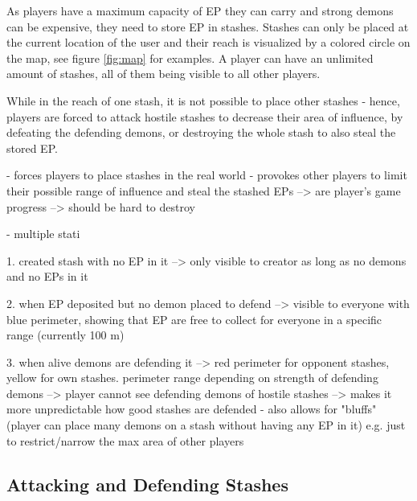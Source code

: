 As players have a maximum capacity of EP they can carry and strong demons can be expensive, they need to store EP in stashes.
Stashes can only be placed at the current location of the user and their reach is visualized by a colored circle on the map, see figure \ref{fig:map} for examples.
A player can have an unlimited amount of stashes, all of them being visible to all other players. 

While in the reach of one stash, it is not possible to place other stashes - hence, players are forced to attack hostile stashes to decrease their area of influence, by defeating the defending demons, or destroying the whole stash to also steal the stored EP.

- forces players to place stashes in the real world 
- provokes other players to limit their possible range of influence and steal the stashed EPs
--> are player's game progress
--> should be hard to destroy

- multiple stati

1. created stash with no EP in it --> only visible to creator as long as no demons and no EPs in it

2. when EP deposited but no demon placed to defend --> visible to everyone with blue perimeter, showing that EP are free to collect for everyone in a specific range (currently 100 m)

3. when alive demons are defending it --> red perimeter for opponent stashes, yellow for own stashes. perimeter range depending on strength of defending demons
--> player cannot see defending demons of hostile stashes --> makes it more unpredictable how good stashes are defended
- also allows for "bluffs" (player can place many demons on a stash without having any EP in it) e.g. just to restrict/narrow the max area of other players


\subsection{Attacking and Defending Stashes}
\label{subsec:attackingstashes}

